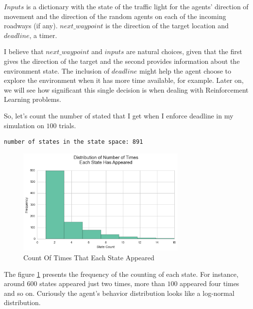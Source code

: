 \documentclass[a4paper]{article}
\begin{document}
$Inputs$ is a dictionary with the state of the traffic light for the agents' direction of movement and the direction of the random agents on each of the incoming roadways (if any). $next\_waypoint$ is the direction of the target location and $deadline$, a timer.

I believe that $next\_waypoint$ and $inputs$ are natural choices, given that the first gives the direction of the target and the second provides information about the environment state. The inclusion of $deadline$ might help the agent choose to explore the environment when it has more time available, for example. Later on, we will see how significant this single decision is when dealing with Reinforcement Learning problems.

So, let's count the number of stated that I get when I enforce deadline in my simulation on $100$ trials.

\begin{lstlisting}
number of states in the state space: 891
\end{lstlisting}

\begin{figure}[ht!]
\centering
\includegraphics[width=0.75\textwidth]{images/basic_agent_behaviour.png}
\caption{\label{fig:hist_basic_agent}Count Of Times That Each State Appeared}
\end{figure}

The figure \ref{fig:hist_basic_agent} presents the frequency of the counting of each state. For instance, around $600$ states appeared just two times, more than $100$ appeared four times and so on. Curiously the agent's behavior distribution looks like a log-normal distribution.

\end{document}

